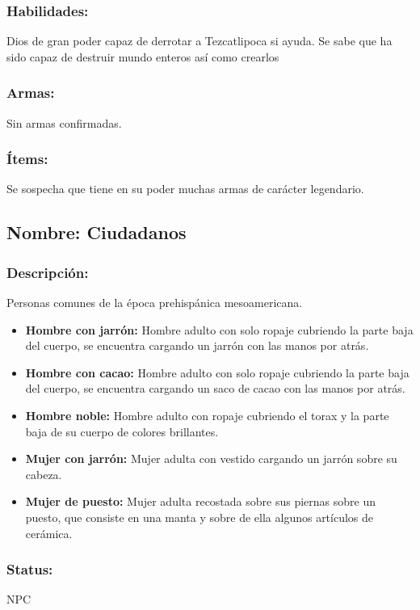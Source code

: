 \documentclass[11pt,letterpaper]{article}
\begin{document}
\subsubsection{Habilidades:}
Dios de gran poder capaz de derrotar a Tezcatlipoca si ayuda. Se sabe que ha sido capaz de destruir mundo enteros así como crearlos
\subsubsection{Armas:}
Sin armas confirmadas.
\subsubsection{Ítems:}
Se sospecha que tiene en su poder muchas armas de carácter legendario.

\subsection{Nombre: Ciudadanos} \label{per.ciudadanos}  
\subsubsection{Descripción:}
Personas comunes de la época prehispánica mesoamericana.
\begin{itemize}
	\item \textbf{Hombre con jarrón:}
	Hombre adulto con solo ropaje cubriendo la parte baja del cuerpo, se encuentra cargando un jarrón con las manos por atrás.
	\item \textbf{Hombre con cacao:}
	Hombre adulto con solo ropaje cubriendo la parte baja del cuerpo, se encuentra cargando un saco de cacao con las manos por atrás.
	\item \textbf{Hombre noble:}
	Hombre adulto con ropaje cubriendo el torax y la parte baja de su cuerpo de colores brillantes.	
	\item \textbf{Mujer con jarrón:}
	Mujer adulta con vestido cargando un jarrón sobre su cabeza.
	\item \textbf{Mujer de puesto:}
	Mujer adulta recostada sobre sus piernas sobre un puesto, que consiste en una manta y sobre de ella algunos artículos de cerámica.	
	\end{itemize} 
\subsubsection{Status:}
NPC
\end{document}
